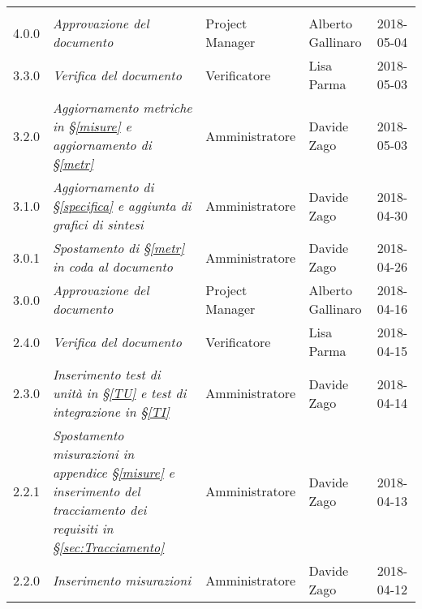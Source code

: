 
\section*{}

	\begin{longtable}[H]{C{2cm}|C{4cm}|C{3cm}|C{3cm}|R{2cm}}
		
		 & & & & \\
		
		
		4.0.0 & \emph{Approvazione del documento} & Project Manager & Alberto Gallinaro & 2018-05-04 \\
		\hline
		
		3.3.0 & \emph{Verifica del documento} & Verificatore &  Lisa Parma & 2018-05-03\\
		\hline
		
		3.2.0 & \emph{Aggiornamento metriche in §\ref{misure} e aggiornamento di §\ref{metr}} & Amministratore & Davide Zago & 2018-05-03 \\
		\hline
		
		3.1.0 & \emph{Aggiornamento di §\ref{specifica} e aggiunta di grafici di sintesi} & Amministratore & Davide Zago & 2018-04-30 \\
		\hline
		
		3.0.1 & \emph{Spostamento di §\ref{metr} in coda al documento} & Amministratore & Davide Zago & 2018-04-26 \\
		\hline
		
		3.0.0 & \emph{Approvazione del documento} & Project Manager & Alberto Gallinaro & 2018-04-16 \\
		\hline
		
		2.4.0 & \emph{Verifica del documento} & Verificatore &  Lisa Parma & 2018-04-15\\
		\hline
		
		2.3.0 & \emph{Inserimento test di unità in §\ref{TU}  e test di integrazione in §\ref{TI}} & Amministratore & Davide Zago & 2018-04-14 \\
		\hline
		
		2.2.1 & \emph{Spostamento misurazioni in appendice §\ref{misure} e inserimento del tracciamento dei requisiti in §\ref{sec:Tracciamento}} & Amministratore & Davide Zago & 2018-04-13 \\
		\hline
		
		2.2.0 & \emph{Inserimento misurazioni} & Amministratore & Davide Zago & 2018-04-12 \\
		\hline
		

\end{longtable}
